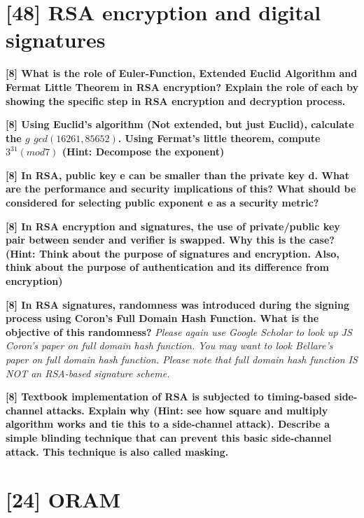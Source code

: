 \documentclass[letterpaper,11pt,notitlepage,fleqn]{article}
\begin{document}
\section{[48] RSA encryption and digital signatures}

\noindent \textbf{[8]  What  is  the  role  of  Euler-Function,  Extended  Euclid  Algorithm  and  Fermat Little  Theorem  in  RSA  encryption?  Explain  the  role  of  each  by  showing  the specific step in RSA encryption and decryption process.}  

\noindent \textbf{[8] Using Euclid’s algorithm (Not extended, but just Euclid), calculate the $g$ $gcd(16261,  85652)$.  Using  Fermat’s  little  theorem,  compute  $3^{31}  (mod  7)$  (Hint: Decompose the exponent)} 

\noindent \textbf{[8]  In  RSA,  public  key  e  can  be  smaller  than  the  private  key  d.  What  are  the performance  and  security  implications  of  this?  What  should  be  considered  for selecting public exponent e as a security metric?}

\noindent \textbf{[8]  In  RSA  encryption  and  signatures,  the  use  of  private/public  key  pair  between sender  and  verifier  is  swapped.  Why  this  is  the  case?  (Hint:  Think  about  the purpose  of  signatures  and  encryption.  Also,  think  about  the  purpose  of authentication and its difference from encryption)}

\noindent \textbf{[8]  In  RSA  signatures,  randomness  was  introduced  during  the  signing  process using  Coron’s  Full  Domain  Hash  Function.  What  is  the  objective  of  this randomness?} \textit{Please again use Google Scholar to look up JS Coron’s paper on full domain hash  function. You may want  to  look Bellare’s paper on  full domain hash function.  Please  note  that  full  domain  hash  function  IS  NOT  an  RSA-based signature scheme.}

\noindent \textbf{[8]  Textbook  implementation  of  RSA    is  subjected  to  timing-based  side-channel attacks. Explain why  (Hint:  see how  square  and multiply  algorithm works  and  tie this  to  a  side-channel  attack).  Describe  a  simple  blinding  technique  that  can prevent this basic side-channel attack. This technique is also called masking.}
 
 
\section{[24] ORAM}
 
\end{document}

